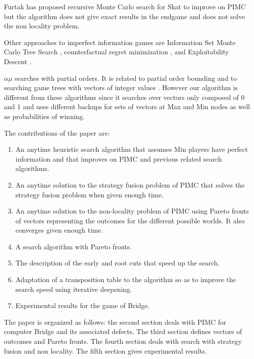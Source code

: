 \documentclass{ecai}
\begin{document}
Furtak has proposed recursive Monte Carlo search for
Skat \cite{furtak2013recursive} to improve on PIMC but the algorithm
does not give exact results in the endgame and does not solve the non
locality problem.

Other approaches to imperfect information games are Information Set
Monte Carlo Tree Search \cite{cowling2012information}, counterfactual
regret minimization \cite{zinkevich2008regret}, and Exploitability
Descent \cite{lockhart2019computing}.

$\alpha\mu$ searches with partial orders. It is related to partial
order bounding \cite{muller2001partial} and to searching game trees
with vectors of integer values \cite{dasgupta1996searching}. However
our algorithm is different from these algorithms since it searches
over vectors only composed of 0 and 1 and uses different backups for
sets of vectors at Max and Min nodes as well as probabilities of
winning.

The contributions of the paper are:

\begin{enumerate}[topsep=0pt]
\item An anytime heuristic search algorithm that assumes Min
players have perfect information and that improves on PIMC and
previous related search algorithms.
\item An anytime solution to the strategy fusion problem of PIMC that solves the strategy fusion problem when given enough time.
\item An anytime solution to the non-locality problem of PIMC using Pareto
fronts of vectors representing the outcomes for the different possible
worlds. It also converges given enough time.
\item A search algorithm with Pareto fronts.
\item The description of the early and root cuts that speed up the search.
\item Adaptation of a transposition table to the algorithm so as to
improve the search speed using iterative deepening.
\item Experimental results for the game of Bridge.
\end{enumerate}

The paper is organized as follows: the second section deals with PIMC
for computer Bridge and its associated defects. The third section
defines vectors of outcomes and Pareto fronts. The fourth section
deals with search with strategy fusion and non locality. The fifth
section gives experimental results.
\end{document}
